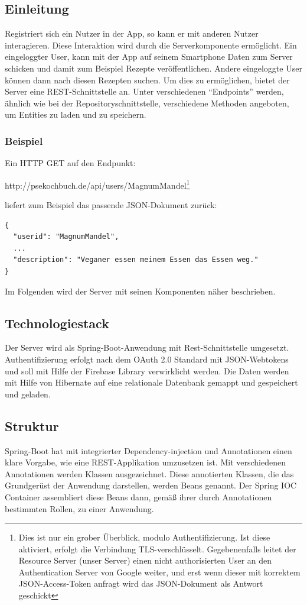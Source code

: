 \subsection{Einleitung}
Registriert sich ein Nutzer in der App, so kann er mit anderen Nutzer interagieren. Diese Interaktion wird durch die Serverkomponente ermöglicht. Ein eingeloggter User, kann mit der App auf seinem Smartphone Daten zum Server schicken und damit zum Beispiel Rezepte veröffentlichen. Andere eingeloggte User können dann nach diesen Rezepten suchen. 
Um dies zu ermöglichen, bietet der Server eine REST-Schnittstelle an. 
Unter verschiedenen "`Endpoints"' werden, ähnlich wie bei der Repositoryschnittstelle, verschiedene Methoden angeboten, um Entities zu laden und zu speichern. 

\subsubsection{Beispiel}
Ein HTTP GET auf den Endpunkt:

http://psekochbuch.de/api/users/MagnumMandel\footnote{Dies ist nur ein grober Überblick, modulo Authentifizierung. Ist diese aktiviert, erfolgt die Verbindung TLS-verschlüsselt. Gegebenenfalls leitet der Resource Server (unser Server) einen nicht authorisierten User an den Authentication Server von Google weiter, und erst wenn dieser mit korrektem JSON-Access-Token anfragt wird das JSON-Dokument als Antwort geschickt}


liefert zum Beispiel das passende JSON-Dokument zurück:
\begin{lstlisting}
{
  "userid": "MagnumMandel",
  ...
  "description": "Veganer essen meinem Essen das Essen weg."
}

\end{lstlisting}


Im Folgenden wird der Server mit seinen Komponenten näher beschrieben. 

\subsection{Technologiestack}
Der Server wird als Spring-Boot-Anwendung mit Rest-Schnittstelle umgesetzt.
Authentifizierung erfolgt nach dem OAuth 2.0 Standard mit JSON-Webtokens und soll mit Hilfe der Firebase Library verwirklicht werden. Die Daten werden mit Hilfe von Hibernate auf eine relationale Datenbank gemappt und gespeichert und geladen. 

\subsection{Struktur} 
Spring-Boot hat mit integrierter Dependency-injection und Annotationen einen klare Vorgabe, wie eine REST-Applikation umzusetzen ist. Mit verschiedenen Annotationen werden Klassen ausgezeichnet. Diese annotierten Klassen, die das Grundgerüst der Anwendung darstellen, werden Beans genannt. Der Spring IOC Container assembliert diese Beans dann, gemäß ihrer durch Annotationen bestimmten Rollen, zu einer Anwendung. 

